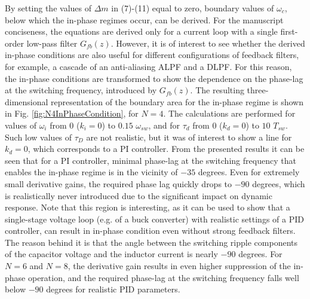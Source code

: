 \documentclass[journal]{IEEEtran}
\begin{document}
By setting the values of $\Delta m$ in (7)-(11) equal to zero, boundary values of $\omega_c$, below which the in-phase regimes occur, can be derived.
For the manuscript conciseness, the equations are derived only for a current loop with a single first-order low-pass filter $G_{fb}(z)$. However, it is of interest to see whether the derived in-phase conditions are also useful for different configurations of feedback filters, for example, a cascade of an anti-aliasing ALPF and a DLPF. For this reason, the in-phase conditions are transformed to show the dependence on the phase-lag at the switching frequency, introduced by $G_{fb}(z)$.
The resulting three-dimensional representation of the boundary area for the in-phase regime is shown in Fig. \ref{fig:N4InPhaseCondition}, for $N = 4$. The calculations are performed for values of $\omega_i$ from $0$ ($k_i = 0$) to $0.15$ $\omega_{sw}$, and for $\tau_d$ from $0$ ($k_d = 0$) to $10$ $T_{sw}$. Such low values of $\tau_D$ are not realistic, but it was of interest to show a line for $k_d = 0$, which corresponds to a PI controller. 
From the presented results it can be seen that for a PI controller, minimal phase-lag at the switching frequency that enables the in-phase regime is in the vicinity of $-35$ degrees. Even for extremely small derivative gains, the required phase lag quickly drops to $-90$ degrees, which is realistically never introduced due to the significant impact on dynamic response. Note that this region is interesting, as it can be used to show that a single-stage voltage loop (e.g. of a buck converter) with realistic settings of a PID controller, can result in in-phase condition even without strong feedback filters. The reason behind it is that the angle between the switching ripple components of the capacitor voltage and the inductor current is nearly $-90$ degrees. For $N = 6$ and $N=8$, the derivative gain results in even higher suppression of the in-phase operation, and the required phase-lag at the switching frequency falls well below $-90$ degrees for realistic PID parameters. 
\end{document}
